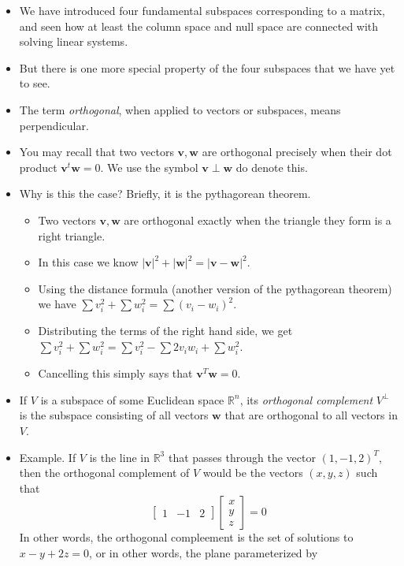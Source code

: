 \documentclass[11pt,oneside]{amsbook}
\newcommand{\RR}{\mathbb R}
\theoremstyle{definition}
\theoremstyle{plain}
\theoremstyle{definition}
\theoremstyle{remark}
\numberwithin{equation}{section}
\numberwithin{figure}{section}
\begin{document}
\begin{itemize}
\item We have introduced four fundamental subspaces corresponding to a matrix, and seen how at least the column space and null space are connected with solving linear systems.
\item But there is one more special property of the four subspaces that we have yet to see.
\item The term \emph{orthogonal}, when applied to vectors or subspaces, means perpendicular.
\item You may recall that two vectors $\mathbf{v},\mathbf{w}$ are orthogonal precisely when their dot product $\mathbf{v}^t\mathbf{w}=0$. We use the symbol $\mathbf{v}\perp\mathbf{w}$ do denote this.
\item Why is this the case? Briefly, it is the pythagorean theorem.
  \begin{itemize}
  \item Two vectors $\mathbf{v},\mathbf{w}$ are orthogonal exactly when the triangle they form is a right triangle.
  \item In this case we know $|\mathbf{v}|^2+|\mathbf{w}|^2=|\mathbf{v-w}|^2$.
  \item Using the distance formula (another version of the pythagorean theorem) we have $\sum v_i^2+\sum w_i^2=\sum(v_i-w_i)^2$.
  \item Distributing the terms of the right hand side, we get $\sum v_i^2+\sum w_i^2=\sum v_i^2-\sum 2v_iw_i+\sum w_i^2$.
  \item Cancelling this simply says that $\mathbf{v}^T\mathbf{w}=0$.
  \end{itemize}
\item If $V$ is a subspace of some Euclidean space $\RR^n$, its \emph{orthogonal complement} $V^\perp$ is the subspace consisting of all vectors $\mathbf{w}$ that are orthogonal to all vectors in $V$.
\item Example. If $V$ is the line in $\RR^3$ that passes through the vector $(1,-1,2)^T$, then the orthogonal complement of $V$ would be the vectors $(x,y,z)$ such that
  \[\begin{bmatrix}1&-1&2\end{bmatrix}
    \begin{bmatrix}x\\y\\z\end{bmatrix}=0
  \]
  In other words, the orthogonal compleement is the set of solutions to $x-y+2z=0$, or in other words, the plane parameterized by

\end{itemize}
\end{document}
